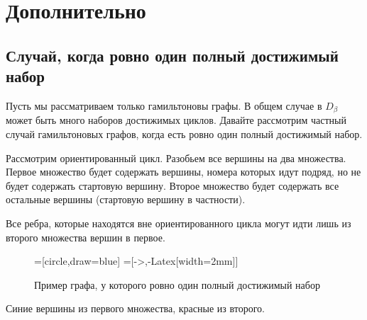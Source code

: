 \documentclass{article}
\begin{document}
\pagebreak

\section{Дополнительно}


\subsection{Случай, когда ровно один полный достижимый набор}

Пусть мы рассматриваем только гамильтоновы графы. В общем случае в $D_{\beta}$ может быть много наборов достижимых циклов.
Давайте рассмотрим частный случай гамильтоновых графов, когда есть ровно один полный достижимый набор.

Рассмотрим ориентированный цикл. Разобьем все вершины на два множества. Первое множество будет содержать вершины, номера которых идут подряд, но не будет содержать стартовую вершину. Второе множество будет содержать все остальные вершины (стартовую вершину в частности). 

Все ребра, которые находятся вне ориентированного цикла могут идти лишь из второго множества вершин в первое.

\begin{figure}[!htb]
\begin{center}
=[circle,draw=blue]
=[->,-{Latex[width=2mm]}]
\caption{Пример графа, у которого ровно один полный достижимый набор}    
\end{center}
\end{figure}
{\color{blue} Синие} вершины из первого множества, {\color{red} красные} из второго.
\end{document}
